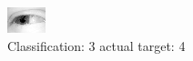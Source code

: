 \begin{figure}[h!]
\begin{center}
\includegraphics[width=0.60\columnwidth]{figures/ID2495_class_3_target_4.png}
\end{center}
\caption{ Classification: 3 actual target: 4}
\label{fig:ID2495_class_3_target_4}
\end{figure}
